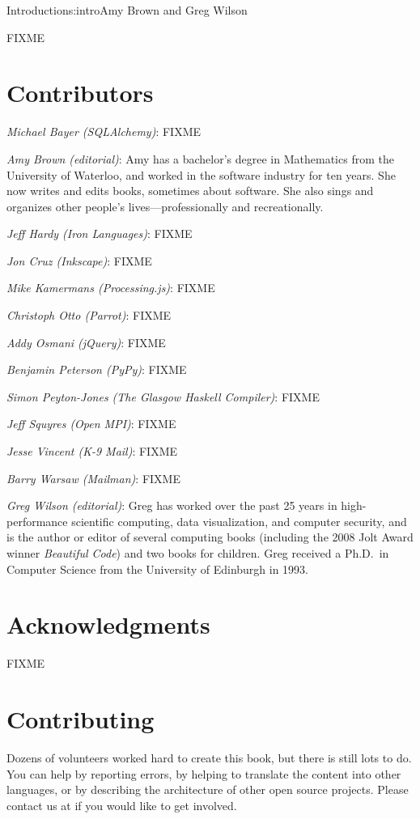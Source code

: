 \begin{aosachapter}{Introduction}{s:intro}{Amy Brown and Greg Wilson}

FIXME

\section*{Contributors}

\emph{Michael Bayer (SQLAlchemy)}: FIXME

\emph{Amy Brown (editorial)}: Amy has a bachelor's degree in
Mathematics from the University of Waterloo, and worked in the
software industry for ten years.  She now writes and edits books,
sometimes about software. She also sings and organizes other people's
lives---professionally and recreationally.

\emph{Jeff Hardy (Iron Languages)}: FIXME

\emph{Jon Cruz (Inkscape)}: FIXME

\emph{Mike Kamermans (Processing.js)}: FIXME

\emph{Christoph Otto (Parrot)}: FIXME

\emph{Addy Osmani (jQuery)}: FIXME

\emph{Benjamin Peterson (PyPy)}: FIXME

\emph{Simon Peyton-Jones (The Glasgow Haskell Compiler)}: FIXME

\emph{Jeff Squyres (Open MPI)}: FIXME

\emph{Jesse Vincent (K-9 Mail)}: FIXME

\emph{Barry Warsaw (Mailman)}: FIXME

\emph{Greg Wilson (editorial)}: Greg has worked over the past 25 years
in high-performance scientific computing, data visualization, and
computer security, and is the author or editor of several computing
books (including the 2008 Jolt Award winner \emph{Beautiful Code}) and
two books for children.  Greg received a Ph.D.\ in Computer Science
from the University of Edinburgh in 1993.

\section*{Acknowledgments}

FIXME

\section*{Contributing}

Dozens of volunteers worked hard to create this book, but there is
still lots to do.  You can help by reporting errors, by helping to
translate the content into other languages, or by describing the
architecture of other open source projects.  Please contact us at
 if you would like to get involved.

\end{aosachapter}
